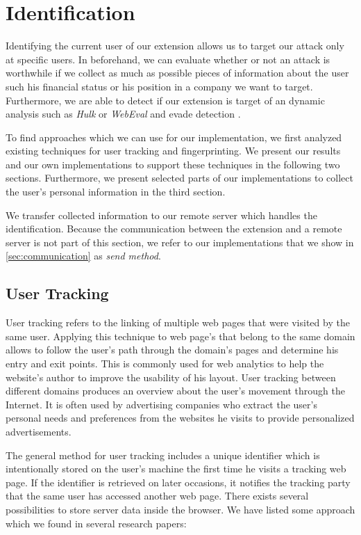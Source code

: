 \newpage	
\section{Identification}
\label{sec:identification}

	Identifying the current user of our extension allows us to target our attack only at specific users. In beforehand, we can evaluate whether or not an attack is worthwhile if we collect as much as possible pieces of information about the user such his financial status or his position in a company we want to target. Furthermore, we are able to detect if our extension is target of an dynamic analysis such as \textit{Hulk} or \textit{WebEval} and evade detection \cite{184485,190984}.
	
	To find approaches which we can use for our implementation, we first analyzed existing techniques for user tracking and fingerprinting. We present our results and our own implementations to support these techniques in the following two sections. Furthermore, we present selected parts of our implementations to collect the user's personal information in the third section.
	
	We transfer collected information to our remote server which handles the identification. Because the communication between the extension and a remote server is not part of this section, we refer to our implementations that we show in \autoref{sec:communication} as \textit{send method}.
	
\subsection{User Tracking}

	User tracking refers to the linking of multiple web pages that were visited by the same user. Applying this technique to web page's that belong to the same domain allows to follow the user's path through the domain's pages and determine his entry and exit points. This is commonly used for web analytics to help the website's author to improve the usability of his layout. User tracking between different domains produces an overview about the user's movement through the Internet. It is often used by advertising companies who extract the user's personal needs and preferences from the websites he visits to provide personalized advertisements.
		
	The general method for user tracking includes a unique identifier which is intentionally stored on the user's machine the first time he visits a tracking web page. If the identifier is retrieved on later occasions, it notifies the tracking party that the same user has accessed another web page. There exists several possibilities to store server data inside the browser. We have listed some approach which we found in several research papers:
	
